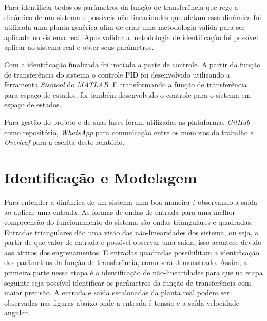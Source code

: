 \documentclass[a4paper,11pt]{article}
\begin{document}
Para identificar todos os parâmetros da função de transferência que rege a dinâmica de um sistema e possíveis não-linearidades que afetam essa dinâmica foi utilizada uma planta genérica afim de criar uma metodologia válida para ser aplicada no sistema real. Após validar a metodologia de identificação foi possível aplicar ao sistema real e obter seus parâmetros.

Com a identificação finalizada foi iniciada a parte de controle. A partir da função de transferência do sistema o controle PID foi desenvolvido utilizando a ferramenta \textit{Sisotool} do \textit{MATLAB}. E transformando a função de transferência para espaço de estados, foi também desenvolvido o controle para o sistema em espaço de estados.

Para gestão do projeto e de suas fases foram utilizadas as plataformas \textit{GitHub} como repositório, \textit{WhatsApp} para comunicação entre os membros do trabalho e \textit{Overleaf} para a escrita deste relatório. 



\section{Identificação e Modelagem}


Para entender a dinâmica de um sistema uma boa maneira é observando a saída ao aplicar uma entrada. As formas de ondas de entrada para uma melhor compreensão do funcionamento do sistema são ondas triangulares e quadradas. Entradas triangulares dão uma visão das não-linearidades dos sistema, ou seja, a partir de que valor de entrada é possível observar uma saída, isso acontece devido aos atritos dos engrenamentos. E entradas quadradas possibilitam a identificação dos parâmetros da função de transferência, como será demonstrado. Assim, a primeira parte nessa etapa é a identificação de não-linearidades para que na etapa seguinte seja possível identificar os parâmetros da função de transferência com maior precisão. A entrada e saída escalonadas da planta real podem ser observadas nas figuras abaixo onde a entrada é tensão e a saída velocidade angular.
\end{document}
